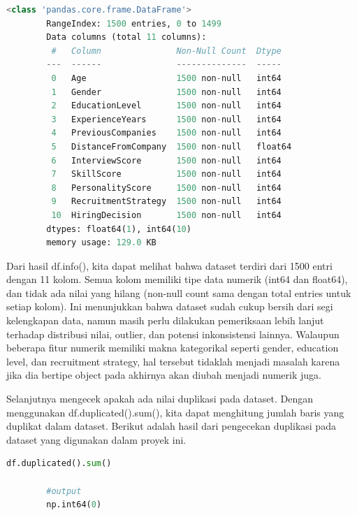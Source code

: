 \begin{center}
    \begin{lstlisting}[language=Python, caption=Info Dataset]
        <class 'pandas.core.frame.DataFrame'>
        RangeIndex: 1500 entries, 0 to 1499
        Data columns (total 11 columns):
         #   Column               Non-Null Count  Dtype  
        ---  ------               --------------  -----  
         0   Age                  1500 non-null   int64  
         1   Gender               1500 non-null   int64  
         2   EducationLevel       1500 non-null   int64  
         3   ExperienceYears      1500 non-null   int64  
         4   PreviousCompanies    1500 non-null   int64  
         5   DistanceFromCompany  1500 non-null   float64
         6   InterviewScore       1500 non-null   int64  
         7   SkillScore           1500 non-null   int64  
         8   PersonalityScore     1500 non-null   int64  
         9   RecruitmentStrategy  1500 non-null   int64  
         10  HiringDecision       1500 non-null   int64  
        dtypes: float64(1), int64(10)
        memory usage: 129.0 KB
    \end{lstlisting}
\end{center}

Dari hasil df.info(), kita dapat melihat bahwa dataset terdiri dari 1500 entri dengan 11 kolom. Semua kolom memiliki tipe data numerik (int64 dan float64), dan tidak ada nilai yang hilang (non-null count sama dengan total entries untuk setiap kolom). Ini menunjukkan bahwa dataset sudah cukup bersih dari segi kelengkapan data, namun masih perlu dilakukan pemeriksaan lebih lanjut terhadap distribusi nilai, outlier, dan potensi inkonsistensi lainnya. Walaupun beberapa fitur numerik memiliki makna kategorikal seperti gender, education level, dan recruitment strategy, hal tersebut tidaklah menjadi masalah karena jika dia bertipe object pada akhirnya akan diubah menjadi numerik juga.

Selanjutnya mengecek apakah ada nilai duplikasi pada dataset. Dengan menggunakan df.duplicated().sum(), kita dapat menghitung jumlah baris yang duplikat dalam dataset. Berikut adalah hasil dari pengecekan duplikasi pada dataset yang digunakan dalam proyek ini.

\newpage
\begin{center}
    \begin{lstlisting}[language=Python, caption=Cek Duplikasi Dataset]
        df.duplicated().sum()

        #output
        np.int64(0)
    \end{lstlisting}
\end{center}

